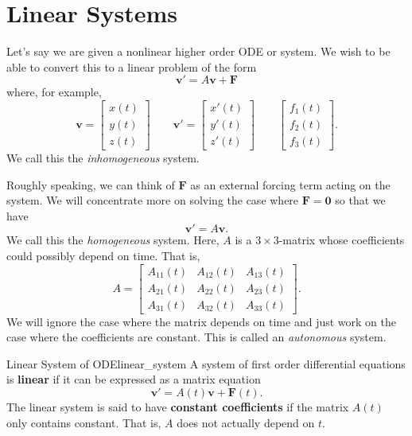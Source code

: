         \section{Linear Systems}
        Let's say we are given a nonlinear higher order ODE or system. We wish to be able to convert this to a linear problem of the form 
        \[
        \mathbf{v}'=A\mathbf{v}+\mathbf{F}
        \]
        where, for example, 
        \[
        \mathbf{v}=\begin{bmatrix} x(t) \\ y(t) \\ z(t) \end{bmatrix} \qquad \mathbf{v}'=\begin{bmatrix} x'(t) \\ y'(t) \\ z'(t) \end{bmatrix} \qquad \begin{bmatrix} f_1(t) \\ f_2(t) \\ f_3(t) \end{bmatrix}.
        \]
        We call this the \emph{inhomogeneous} system. 
        
        Roughly speaking, we can think of $\mathbf{F}$ as an external forcing term acting on the system.  We will concentrate more on solving the case where $\mathbf{F}=\mathbf{0}$ so that we have
        \[
        \mathbf{v}'=A\mathbf{v}.
        \]
        We call this the \emph{homogeneous} system. Here, $A$ is a $3\times 3$-matrix whose coefficients could possibly depend on time.  That is,
        \[
        A = \begin{bmatrix} A_{11}(t) & A_{12}(t) & A_{13}(t)\\
        A_{21}(t) & A_{22}(t) & A_{23}(t)\\
        A_{31}(t) & A_{32}(t) & A_{33}(t)\end{bmatrix}.
        \]
        We will ignore the case where the matrix depends on time and just work on the case where the coefficients are constant. This is called an \emph{autonomous} system.
        
        \begin{df}{Linear System of ODE}{linear_system}
            A system of first order differential equations is \textbf{linear} if it can be expressed as a matrix equation
            \[
            \mathbf{v}' = A(t)\mathbf{v}+\mathbf{F}(t).
            \]
            The linear system is said to have \textbf{constant coefficients} if the matrix $A(t)$ only contains constant.  That is, $A$ does not actually depend on $t$.
        \end{df}
        
